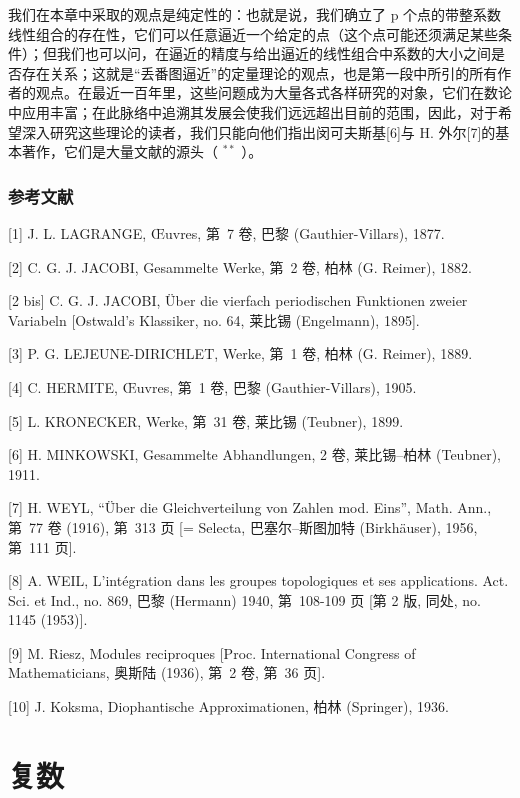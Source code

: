 我们在本章中采取的观点是纯定性的：也就是说，我们确立了 p 个点的带整系数线性组合的存在性，它们可以任意逼近一个给定的点（这个点可能还须满足某些条件）；但我们也可以问，在逼近的精度与给出逼近的线性组合中系数的大小之间是否存在关系；这就是“丢番图逼近”的定量理论的观点，也是第一段中所引的所有作者的观点。在最近一百年里，这些问题成为大量各式各样研究的对象，它们在数论中应用丰富；在此脉络中追溯其发展会使我们远远超出目前的范围，因此，对于希望深入研究这些理论的读者，我们只能向他们指出闵可夫斯基{[}6{]}与 H. 外尔{[}7{]}的基本著作，它们是大量文献的源头（ \(^{**}\) ）。

\subsection*{参考文献}

{[}1{]} J. L. LAGRANGE, Œuvres, 第~7 卷, 巴黎 (Gauthier-Villars), 1877.

{[}2{]} C. G. J. JACOBI, Gesammelte Werke, 第~2 卷, 柏林 (G. Reimer), 1882.

{[}2 bis{]} C. G. J. JACOBI, Über die vierfach periodischen Funktionen zweier Variabeln {[}Ostwald's Klassiker, no. 64, 莱比锡 (Engelmann), 1895{]}.

{[}3{]} P. G. LEJEUNE-DIRICHLET, Werke, 第~1 卷, 柏林 (G. Reimer), 1889.

{[}4{]} C. HERMITE, Œuvres, 第~1 卷, 巴黎 (Gauthier-Villars), 1905.

{[}5{]} L. KRONECKER, Werke, 第~31 卷, 莱比锡 (Teubner), 1899.

{[}6{]} H. MINKOWSKI, Gesammelte Abhandlungen, 2 卷, 莱比锡–柏林 (Teubner), 1911.

{[}7{]} H. WEYL, ``Über die Gleichverteilung von Zahlen mod. Eins'', Math. Ann., 第~77 卷 (1916), 第~313 页 {[}= Selecta, 巴塞尔–斯图加特 (Birkhäuser), 1956, 第~111 页{]}.

{[}8{]} A. WEIL, L'intégration dans les groupes topologiques et ses applications. Act. Sci. et Ind., no. 869, 巴黎 (Hermann) 1940, 第~108-109 页 {[}第 2 版, 同处, no. 1145 (1953){]}.

{[}9{]} M. Riesz, Modules reciproques {[}Proc. International Congress of Mathematicians, 奥斯陆 (1936), 第~2 卷, 第~36 页{]}.

{[}10{]} J. Koksma, Diophantische Approximationen, 柏林 (Springer), 1936.

\chapter{复数}

